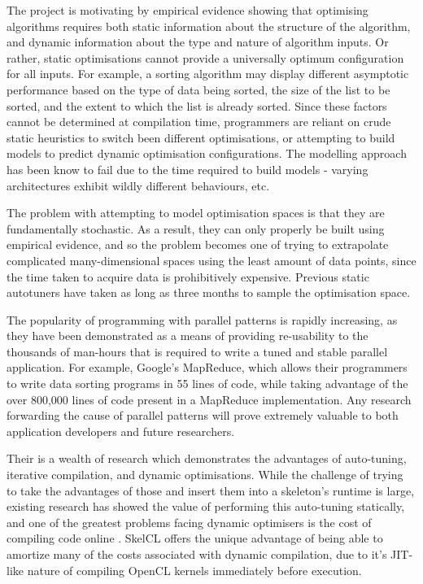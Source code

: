The project is motivating by empirical evidence showing that
optimising algorithms requires both static information about the
structure of the algorithm, and dynamic information about the type and
nature of algorithm inputs. Or rather, static optimisations cannot
provide a universally optimum configuration for all inputs. For
example, a sorting algorithm may display different asymptotic
performance based on the type of data being sorted, the size of the
list to be sorted, and the extent to which the list is already
sorted. Since these factors cannot be determined at compilation time,
programmers are reliant on crude static heuristics to switch been
different optimisations, or attempting to build models to predict
dynamic optimisation configurations. The modelling approach has been
know to fail due to the time required to build models - varying
architectures exhibit wildly different behaviours, etc.

The problem with attempting to model optimisation spaces is that they
are fundamentally stochastic. As a result, they can only properly be
built using empirical evidence, and so the problem becomes one of
trying to extrapolate complicated many-dimensional spaces using the
least amount of data points, since the time taken to acquire data is
prohibitively expensive. Previous static autotuners have taken as long
as three months to sample the optimisation space.

The popularity of programming with parallel patterns is rapidly
increasing, as they have been demonstrated as a means of providing
re-usability to the thousands of man-hours that is required to write a
tuned and stable parallel application. For example, Google's
MapReduce, which allows their programmers to write data sorting
programs in 55 lines of code, while taking advantage of the over
800,000 lines of code present in a MapReduce implementation. Any
research forwarding the cause of parallel patterns will prove
extremely valuable to both application developers and future
researchers.

Their is a wealth of research which demonstrates the advantages of
auto-tuning, iterative compilation, and dynamic optimisations. While
the challenge of trying to take the advantages of those and insert
them into a skeleton's runtime is large, existing research has showed
the value of performing this auto-tuning statically, and one of the
greatest problems facing dynamic optimisers is the cost of compiling
code online . SkelCL offers the unique advantage of being able to
amortize many of the costs associated with dynamic compilation, due to
it's JIT-like nature of compiling OpenCL kernels immediately before
execution.

